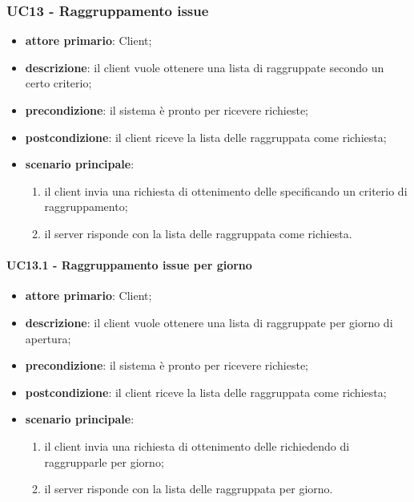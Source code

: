 \subsubsection{UC13 - Raggruppamento issue}
\begin{itemize}
	\item \textbf{attore primario}: Client;
	\item \textbf{descrizione}: il client vuole ottenere una lista di  raggruppate secondo un certo criterio;
	\item \textbf{precondizione}:  il sistema è pronto per ricevere richieste;
	\item \textbf{postcondizione}: il client riceve la lista delle  raggruppata come richiesta;
	\item \textbf{scenario principale}: 
	\begin{enumerate}
		\item il client invia una richiesta di ottenimento delle  specificando un criterio di raggruppamento;
		\item il server risponde con la lista delle  raggruppata come richiesta.
	\end{enumerate}
\end{itemize}
\paragraph{UC13.1 - Raggruppamento issue per giorno}
\begin{itemize}
	\item \textbf{attore primario}: Client;
	\item \textbf{descrizione}: il client vuole ottenere una lista di  raggruppate per giorno di apertura;
	\item \textbf{precondizione}:  il sistema è pronto per ricevere richieste;
	\item \textbf{postcondizione}: il client riceve la lista delle  raggruppata come richiesta;
	\item \textbf{scenario principale}: 
	\begin{enumerate}
		\item il client invia una richiesta di ottenimento delle  richiedendo di raggrupparle per giorno;
		\item il server risponde con la lista delle  raggruppata per giorno.
	\end{enumerate}
\end{itemize}
